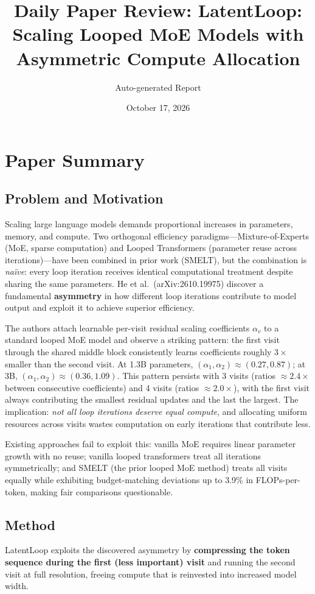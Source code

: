 \documentclass[11pt,a4paper]{article}
\title{Daily Paper Review: LatentLoop: Scaling Looped MoE Models with Asymmetric Compute Allocation}
\author{Auto-generated Report}
\date{October 17, 2026}
\begin{document}
\maketitle

\section{Paper Summary}

\subsection{Problem and Motivation}
Scaling large language models demands proportional increases in parameters, memory, and compute. Two orthogonal efficiency paradigms---Mixture-of-Experts (MoE, sparse computation) and Looped Transformers (parameter reuse across iterations)---have been combined in prior work (SMELT), but the combination is \emph{na\"ive}: every loop iteration receives identical computational treatment despite sharing the same parameters. He et al.\ (arXiv:2610.19975) discover a fundamental \textbf{asymmetry} in how different loop iterations contribute to model output and exploit it to achieve superior efficiency.

The authors attach learnable per-visit residual scaling coefficients $\alpha_v$ to a standard looped MoE model and observe a striking pattern: the first visit through the shared middle block consistently learns coefficients roughly $3\times$ smaller than the second visit. At 1.3B parameters, $(\alpha_1, \alpha_2) \approx (0.27, 0.87)$; at 3B, $(\alpha_1, \alpha_2) \approx (0.36, 1.09)$. This pattern persists with 3 visits (ratios $\approx 2.4\times$ between consecutive coefficients) and 4 visits (ratios $\approx 2.0\times$), with the first visit always contributing the smallest residual updates and the last the largest. The implication: \emph{not all loop iterations deserve equal compute}, and allocating uniform resources across visits wastes computation on early iterations that contribute less.

Existing approaches fail to exploit this: vanilla MoE requires linear parameter growth with no reuse; vanilla looped transformers treat all iterations symmetrically; and SMELT (the prior looped MoE method) treats all visits equally while exhibiting budget-matching deviations up to 3.9\% in FLOPs-per-token, making fair comparisons questionable.

\subsection{Method}
LatentLoop exploits the discovered asymmetry by \textbf{compressing the token sequence during the first (less important) visit} and running the second visit at full resolution, freeing compute that is reinvested into increased model width.
\end{document}
